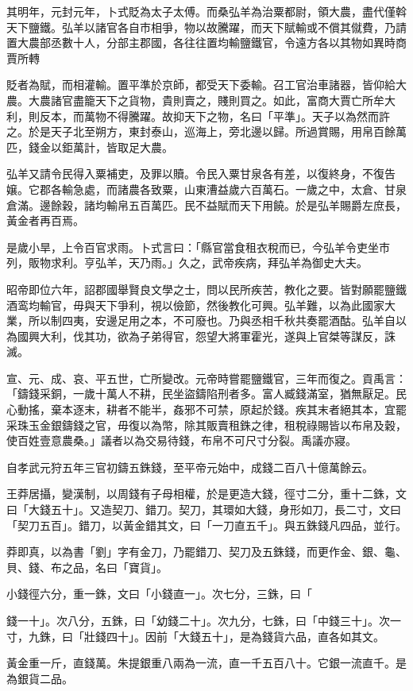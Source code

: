 \begin{pinyinscope}
其明年，元封元年，卜式貶為太子太傅。而桑弘羊為治粟都尉，領大農，盡代僅斡天下鹽鐵。弘羊以諸官各自市相爭，物以故騰躍，而天下賦輸或不償其僦費，乃請置大農部丞數十人，分部主郡國，各往往置均輸鹽鐵官，令遠方各以其物如異時商賈所轉

貶者為賦，而相灌輸。置平準於京師，都受天下委輸。召工官治車諸器，皆仰給大農。大農諸官盡籠天下之貨物，貴則賣之，賤則買之。如此，富商大賈亡所牟大利，則反本，而萬物不得騰躍。故抑天下之物，名曰「平準」。天子以為然而許之。於是天子北至朔方，東封泰山，巡海上，旁北邊以歸。所過賞賜，用帛百餘萬匹，錢金以鉅萬計，皆取足大農。

弘羊又請令民得入粟補吏，及罪以贖。令民入粟甘泉各有差，以復終身，不復告嬢。它郡各輸急處，而諸農各致粟，山東漕益歲六百萬石。一歲之中，太倉、甘泉倉滿。邊餘穀，諸均輸帛五百萬匹。民不益賦而天下用饒。於是弘羊賜爵左庶長，黃金者再百焉。

是歲小旱，上令百官求雨。卜式言曰：「縣官當食租衣稅而已，今弘羊令吏坐市列，販物求利。亨弘羊，天乃雨。」久之，武帝疾病，拜弘羊為御史大夫。

昭帝即位六年，詔郡國舉賢良文學之士，問以民所疾苦，教化之要。皆對願罷鹽鐵酒鸾均輸官，毋與天下爭利，視以儉節，然後教化可興。弘羊難，以為此國家大業，所以制四夷，安邊足用之本，不可廢也。乃與丞相千秋共奏罷酒酤。弘羊自以為國興大利，伐其功，欲為子弟得官，怨望大將軍霍光，遂與上官桀等謀反，誅滅。

宣、元、成、哀、平五世，亡所變改。元帝時嘗罷鹽鐵官，三年而復之。貢禹言：「鑄錢采銅，一歲十萬人不耕，民坐盜鑄陷刑者多。富人臧錢滿室，猶無厭足。民心動搖，棄本逐末，耕者不能半，姦邪不可禁，原起於錢。疾其末者絕其本，宜罷采珠玉金銀鑄錢之官，毋復以為幣，除其販賣租銖之律，租稅祿賜皆以布帛及穀，使百姓壹意農桑。」議者以為交易待錢，布帛不可尺寸分裂。禹議亦寢。

自孝武元狩五年三官初鑄五銖錢，至平帝元始中，成錢二百八十億萬餘云。

王莽居攝，變漢制，以周錢有子母相權，於是更造大錢，徑寸二分，重十二銖，文曰「大錢五十」。又造契刀、錯刀。契刀，其環如大錢，身形如刀，長二寸，文曰「契刀五百」。錯刀，以黃金錯其文，曰「一刀直五千」。與五銖錢凡四品，並行。

莽即真，以為書「劉」字有金刀，乃罷錯刀、契刀及五銖錢，而更作金、銀、龜、貝、錢、布之品，名曰「寶貨」。

小錢徑六分，重一銖，文曰「小錢直一」。次七分，三銖，曰「

錢一十」。次八分，五銖，曰「幼錢二十」。次九分，七銖，曰「中錢三十」。次一寸，九銖，曰「壯錢四十」。因前「大錢五十」，是為錢貨六品，直各如其文。

黃金重一斤，直錢萬。朱提銀重八兩為一流，直一千五百八十。它銀一流直千。是為銀貨二品。


\end{pinyinscope}
